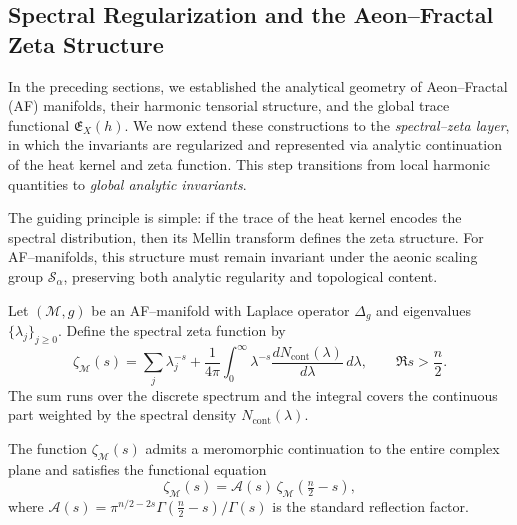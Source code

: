 \subsection{Spectral Regularization and the Aeon–Fractal Zeta Structure}
\label{subsec:AF-spectral-regularization}
\relax \hspace{0pt}


In the preceding sections, we established the analytical geometry of
Aeon–Fractal (AF) manifolds, their harmonic tensorial structure,
and the global trace functional \(\mathfrak{E}_X(h)\).
We now extend these constructions to the \emph{spectral–zeta layer},
in which the invariants are regularized and represented
via analytic continuation of the heat kernel and zeta function.
This step transitions from local harmonic quantities to
\emph{global analytic invariants}.

The guiding principle is simple:
if the trace of the heat kernel encodes the spectral distribution,
then its Mellin transform defines the zeta structure.
For AF–manifolds, this structure must remain invariant under
the aeonic scaling group \(\mathcal{S}_\alpha\),
preserving both analytic regularity and topological content.


\begin{definition}
\label{def:AF-zeta}
Let \((\mathcal{M},g)\) be an AF–manifold with Laplace operator \(\Delta_g\)
and eigenvalues \(\{\lambda_j\}_{j\ge 0}\).
Define the spectral zeta function by
\begin{equation}
\label{eq:AF-zeta}
\zeta_{\mathcal{M}}(s)
=
\sum_{j} \lambda_j^{-s}
+
\frac{1}{4\pi}
\int_{0}^{\infty}
\lambda^{-s}
\frac{dN_{\mathrm{cont}}(\lambda)}{d\lambda}
\,d\lambda,
\qquad \Re s > \frac{n}{2}.
\end{equation}
The sum runs over the discrete spectrum
and the integral covers the continuous part
weighted by the spectral density \(N_{\mathrm{cont}}(\lambda)\).
\end{definition}

\begin{theorem}
\label{thm:zeta-analytic}
The function \(\zeta_{\mathcal{M}}(s)\)
admits a meromorphic continuation to the entire complex plane
and satisfies the functional equation
\begin{equation}
\label{eq:zeta-functional}
\zeta_{\mathcal{M}}(s)
=
\mathcal{A}(s)
\,\zeta_{\mathcal{M}}\!\left(\tfrac{n}{2}-s\right),
\end{equation}
where
\(\mathcal{A}(s) = \pi^{n/2-2s}\Gamma\!\left(\tfrac{n}{2}-s\right)/\Gamma(s)\)
is the standard reflection factor.
\end{theorem}

